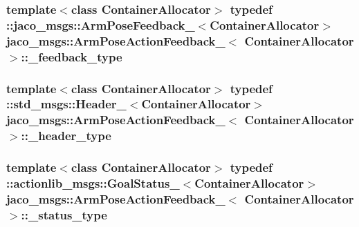 \subsubsection[{\texorpdfstring{\+\_\+feedback\+\_\+type}{_feedback_type}}]{\setlength{\rightskip}{0pt plus 5cm}template$<$class Container\+Allocator$>$ typedef \+::{\bf jaco\+\_\+msgs\+::\+Arm\+Pose\+Feedback\+\_\+}$<$Container\+Allocator$>$ {\bf jaco\+\_\+msgs\+::\+Arm\+Pose\+Action\+Feedback\+\_\+}$<$ Container\+Allocator $>$\+::{\bf \+\_\+feedback\+\_\+type}}\hypertarget{structjaco__msgs_1_1ArmPoseActionFeedback___aeb40aa6cf61cdbbfc66dd06afad5966f}{}\label{structjaco__msgs_1_1ArmPoseActionFeedback___aeb40aa6cf61cdbbfc66dd06afad5966f}
\subsubsection[{\texorpdfstring{\+\_\+header\+\_\+type}{_header_type}}]{\setlength{\rightskip}{0pt plus 5cm}template$<$class Container\+Allocator$>$ typedef \+::std\+\_\+msgs\+::\+Header\+\_\+$<$Container\+Allocator$>$ {\bf jaco\+\_\+msgs\+::\+Arm\+Pose\+Action\+Feedback\+\_\+}$<$ Container\+Allocator $>$\+::{\bf \+\_\+header\+\_\+type}}\hypertarget{structjaco__msgs_1_1ArmPoseActionFeedback___a69a211a498e91546eee88514ed284ebb}{}\label{structjaco__msgs_1_1ArmPoseActionFeedback___a69a211a498e91546eee88514ed284ebb}
\subsubsection[{\texorpdfstring{\+\_\+status\+\_\+type}{_status_type}}]{\setlength{\rightskip}{0pt plus 5cm}template$<$class Container\+Allocator$>$ typedef \+::actionlib\+\_\+msgs\+::\+Goal\+Status\+\_\+$<$Container\+Allocator$>$ {\bf jaco\+\_\+msgs\+::\+Arm\+Pose\+Action\+Feedback\+\_\+}$<$ Container\+Allocator $>$\+::{\bf \+\_\+status\+\_\+type}}\hypertarget{structjaco__msgs_1_1ArmPoseActionFeedback___ad4f8a93bf87c5fd004a8523ca2182c2c}{}\label{structjaco__msgs_1_1ArmPoseActionFeedback___ad4f8a93bf87c5fd004a8523ca2182c2c}
